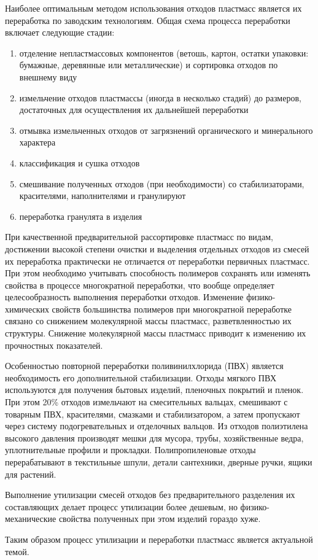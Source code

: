 Наиболее оптимальным методом использования отходов пластмасс является их
переработка по заводским технологиям. Общая схема процесса переработки
включает следующие стадии:
\begin{enumerate}[1.]
\item отделение непластмассовых компонентов (ветошь, картон, остатки упаковки:
	бумажные, деревянные или металлические) и сортировка отходов по внешнему виду
\item измельчение отходов пластмассы (иногда в несколько стадий) до размеров,
	достаточных для осуществления их дальнейшей переработки
\item отмывка измельченных отходов от загрязнений органического и минерального
	характера
\item классификация и сушка отходов
\item смешивание полученных отходов (при необходимости) со стабилизаторами,
	красителями, наполнителями и гранулируют
\item переработка гранулята в изделия
\end{enumerate}

При качественной предварительной рассортировке пластмасс по видам, достижении высокой
степени очистки и выделения отдельных отходов из смесей их переработка практически не
отличается от переработки первичных пластмасс. При этом необходимо учитывать способность
полимеров сохранять или изменять свойства в процессе многократной переработки, что
вообще определяет целесообразность выполнения переработки отходов. Изменение физико-химических
свойств большинства полимеров при многократной переработке связано со снижением молекулярной
массы пластмасс, разветвленностью их структуры. Снижение молекулярной массы пластмасс
приводит к изменению их прочностных показателей.

Особенностью повторной переработки поливинилхлорида (ПВХ) является необходимость
его дополнительной стабилизации. Отходы мягкого ПВХ используются для получения
бытовых изделий, пленочных покрытий и пленок. При этом 20\% отходов измельчают
на смесительных вальцах, смешивают с товарным ПВХ, красителями, смазками и
стабилизатором, а затем пропускают через систему подогревательных и отделочных
вальцов. Из отходов полиэтилена высокого давления производят мешки для мусора,
трубы, хозяйственные ведра, уплотнительные профили и прокладки. Полипропиленовые
отходы перерабатывают в текстильные шпули, детали сантехники, дверные ручки, ящики для растений.

Выполнение утилизации смесей отходов без предварительного разделения их
составляющих делает процесс утилизации более дешевым, но физико-механические
свойства полученных при этом изделий гораздо хуже.

Таким образом процесс утилизации и переработки пластмасс является актуальной темой.
